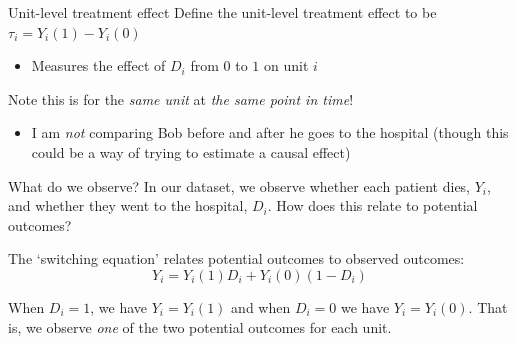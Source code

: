 \documentclass[aspectratio=169,t,11pt,table]{beamer}
\begin{document}
\begin{frame}{Unit-level treatment effect}
  Define the \alert{unit-level treatment effect} to be $\tau_i = Y_i(1) - Y_i(0)$
  \begin{itemize}
    \item Measures the effect of $D_i$ from $0$ to $1$ on unit $i$
  \end{itemize}

  \bigskip
  Note this is for the \emph{same unit} at \emph{the same point in time}!
  
  \pause
  \begin{itemize}
    \item I am \emph{not} comparing Bob before and after he goes to the hospital (though this could be a way of trying to estimate a causal effect)
  \end{itemize}
\end{frame}

\begin{frame}{What do we observe?}
  In our dataset, we observe whether each patient dies, $Y_i$, and whether they went to the hospital, $D_i$. How does this relate to potential outcomes?
  
  \bigskip
  The \alert{`switching equation'} relates potential outcomes to observed outcomes:
  $$
    Y_i = Y_i(1) D_i + Y_i(0) (1 - D_i)
  $$

  \pause
  \bigskip
  When $D_i = 1$, we have $Y_i = Y_i(1)$ and when $D_i = 0$ we have $Y_i = Y_i(0)$. That is, we observe \emph{one} of the two potential outcomes for each unit.
\end{frame}
\end{document}
